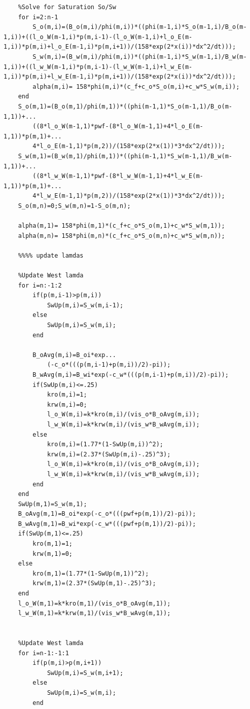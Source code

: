 \documentclass[12pt,letterpaper,titlepage]{article}
\begin{document}
\begin{verbatim}
    %Solve for Saturation So/Sw
    for i=2:n-1
        S_o(m,i)=(B_o(m,i)/phi(m,i))*((phi(m-1,i)*S_o(m-1,i)/B_o(m-1,i))+((l_o_W(m-1,i)*p(m,i-1)-(l_o_W(m-1,i)+l_o_E(m-1,i))*p(m,i)+l_o_E(m-1,i)*p(m,i+1))/(158*exp(2*x(i))*dx^2/dt)));
        S_w(m,i)=(B_w(m,i)/phi(m,i))*((phi(m-1,i)*S_w(m-1,i)/B_w(m-1,i))+((l_w_W(m-1,i)*p(m,i-1)-(l_w_W(m-1,i)+l_w_E(m-1,i))*p(m,i)+l_w_E(m-1,i)*p(m,i+1))/(158*exp(2*x(i))*dx^2/dt)));
        alpha(m,i)= 158*phi(m,i)*(c_f+c_o*S_o(m,i)+c_w*S_w(m,i));
    end
    S_o(m,1)=(B_o(m,1)/phi(m,1))*((phi(m-1,1)*S_o(m-1,1)/B_o(m-1,1))+...
        ((8*l_o_W(m-1,1)*pwf-(8*l_o_W(m-1,1)+4*l_o_E(m-1,1))*p(m,1)+...
        4*l_o_E(m-1,1)*p(m,2))/(158*exp(2*x(1))*3*dx^2/dt)));
    S_w(m,1)=(B_w(m,1)/phi(m,1))*((phi(m-1,1)*S_w(m-1,1)/B_w(m-1,1))+...
        ((8*l_w_W(m-1,1)*pwf-(8*l_w_W(m-1,1)+4*l_w_E(m-1,1))*p(m,1)+...
        4*l_w_E(m-1,1)*p(m,2))/(158*exp(2*x(1))*3*dx^2/dt)));
    S_o(m,n)=0;S_w(m,n)=1-S_o(m,n);
    
    alpha(m,1)= 158*phi(m,1)*(c_f+c_o*S_o(m,1)+c_w*S_w(m,1));
    alpha(m,n)= 158*phi(m,n)*(c_f+c_o*S_o(m,n)+c_w*S_w(m,n));
    
    %%%% update lamdas
    
    %Update West lamda
    for i=n:-1:2
        if(p(m,i-1)>p(m,i))
            SwUp(m,i)=S_w(m,i-1);
        else
            SwUp(m,i)=S_w(m,i);
        end
        
        B_oAvg(m,i)=B_oi*exp...
            (-c_o*(((p(m,i-1)+p(m,i))/2)-pi));
        B_wAvg(m,i)=B_wi*exp(-c_w*(((p(m,i-1)+p(m,i))/2)-pi));
        if(SwUp(m,i)<=.25)
            kro(m,i)=1;
            krw(m,i)=0;
            l_o_W(m,i)=k*kro(m,i)/(vis_o*B_oAvg(m,i));
            l_w_W(m,i)=k*krw(m,i)/(vis_w*B_wAvg(m,i));
        else
            kro(m,i)=(1.77*(1-SwUp(m,i))^2);
            krw(m,i)=(2.37*(SwUp(m,i)-.25)^3);
            l_o_W(m,i)=k*kro(m,i)/(vis_o*B_oAvg(m,i));
            l_w_W(m,i)=k*krw(m,i)/(vis_w*B_wAvg(m,i));
        end
    end
    SwUp(m,1)=S_w(m,1);
    B_oAvg(m,1)=B_oi*exp(-c_o*(((pwf+p(m,1))/2)-pi));
    B_wAvg(m,1)=B_wi*exp(-c_w*(((pwf+p(m,1))/2)-pi));
    if(SwUp(m,1)<=.25)
        kro(m,1)=1;
        krw(m,1)=0;
    else
        kro(m,1)=(1.77*(1-SwUp(m,1))^2);
        krw(m,1)=(2.37*(SwUp(m,1)-.25)^3);
    end
    l_o_W(m,1)=k*kro(m,1)/(vis_o*B_oAvg(m,1));
    l_w_W(m,1)=k*krw(m,1)/(vis_w*B_wAvg(m,1));
    
    
    %Update West lamda
    for i=n-1:-1:1
        if(p(m,i)>p(m,i+1))
            SwUp(m,i)=S_w(m,i+1);
        else
            SwUp(m,i)=S_w(m,i);
        end
        

\end{verbatim}
\end{document}
